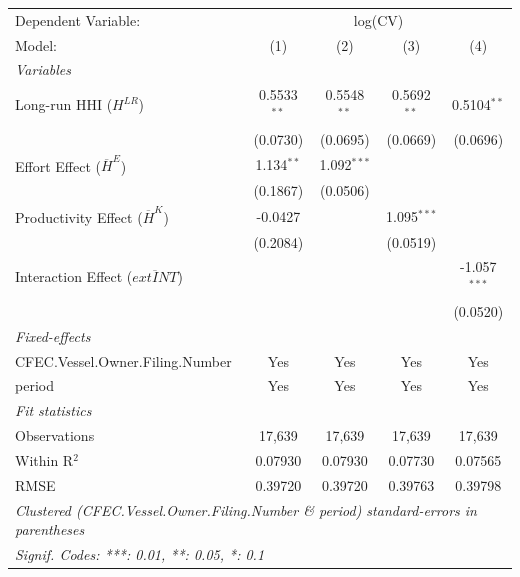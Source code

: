 
\begingroup
\centering
\begin{tabular}{lcccc}
   \tabularnewline \midrule \midrule
   Dependent Variable: & \multicolumn{4}{c}{log(CV)}\\
   Model:                                        & (1)           & (2)           & (3)           & (4)\\  
   \midrule
   \emph{Variables}\\
   Long-run HHI ($H^{LR}$)                       & 0.5533$^{**}$ & 0.5548$^{**}$ & 0.5692$^{**}$ & 0.5104$^{**}$\\   
                                                 & (0.0730)      & (0.0695)      & (0.0669)      & (0.0696)\\   
   Effort Effect ($\overline{H}^E$)              & 1.134$^{**}$  & 1.092$^{***}$ &               &   \\   
                                                 & (0.1867)      & (0.0506)      &               &   \\   
   Productivity Effect ($\overline{H}^K$)        & -0.0427       &               & 1.095$^{***}$ &   \\   
                                                 & (0.2084)      &               & (0.0519)      &   \\   
   Interaction Effect ($\overline{	ext{INT}}$)  &               &               &               & -1.057$^{***}$\\   
                                                 &               &               &               & (0.0520)\\   
   \midrule
   \emph{Fixed-effects}\\
   CFEC.Vessel.Owner.Filing.Number               & Yes           & Yes           & Yes           & Yes\\  
   period                                        & Yes           & Yes           & Yes           & Yes\\  
   \midrule
   \emph{Fit statistics}\\
   Observations                                  & 17,639        & 17,639        & 17,639        & 17,639\\  
   Within R$^2$                                  & 0.07930       & 0.07930       & 0.07730       & 0.07565\\  
   RMSE                                          & 0.39720       & 0.39720       & 0.39763       & 0.39798\\  
   \midrule \midrule
   \multicolumn{5}{l}{\emph{Clustered (CFEC.Vessel.Owner.Filing.Number \& period) standard-errors in parentheses}}\\
   \multicolumn{5}{l}{\emph{Signif. Codes: ***: 0.01, **: 0.05, *: 0.1}}\\
\end{tabular}
\par\endgroup


